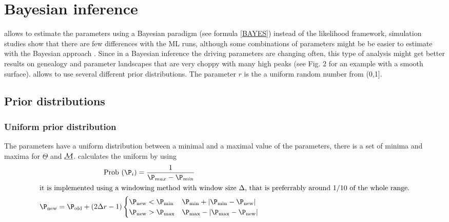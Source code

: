 \section{Bayesian inference}
\migrate allows to estimate the parameters using a Bayesian paradigm (see formula \ref{BAYES}) instead of the likelihood framework, simulation studies show that there are few differences with the ML runs, although some combinations of parameters might be be easier to estimate with the Bayesian approach \citep{beerli:2006:CBM}. Since in a Bayesian inference the driving parameters are changing often, this type of analysis might get better results on genealogy and parameter landscapes that are very choppy with many high peaks (see Fig. 2 for an example with a smooth surface). \migrate allows to use several different prior distributions. The parameter $r$ is the a uniform random number from (0,1].

\subsection{Prior distributions}
\vskip -0.5cm
\subsubsection{Uniform prior distribution}
The parameters have a uniform distribution between a minimal and a maximal value of the parameters, there is a set of minima and maxima for $\underline{\Theta}$ and $\underline{\mathcal{M}}$.
\migrate calculates the uniform by using
\begin{gather}
\label{UNIPRIOR}
    \prob(\P_i) =  \frac{1}{\P_{max} - \P_{min}} \\
    \intertext{it is implemented using a windowing method with window size $\Delta$, that is preferrably around 1/10 of the whole range.}
    \P_{\rm new} =  \P_{\rm old} + (2 \Delta r - 1) \begin{cases} \P_{\rm new} < \P_{\rm min}  &  \P_{\rm min} + |\P_{\rm min} - \P_{\rm new}| \\
     \P_{\rm new} > \P_{\rm max}  &  \P_{\rm max} - |\P_{\rm max} - \P_{\rm new}| \end{cases}
\end{gather}

